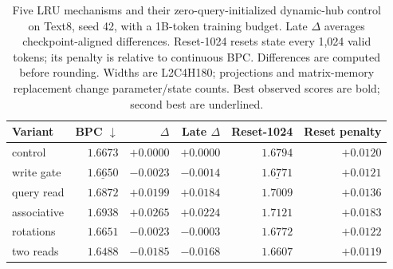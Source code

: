 \begin{table}[H]
\centering
\caption{Five LRU mechanisms and their zero-query-initialized dynamic-hub control on Text8, seed 42, with a 1B-token training budget. Late $\Delta$ averages checkpoint-aligned differences. Reset-1024 resets state every 1,024 valid tokens; its penalty is relative to continuous BPC. Differences are computed before rounding. Widths are L2C4H180; projections and matrix-memory replacement change parameter/state counts. Best observed scores are bold; second best are underlined.}
\label{tab:lruvariants}
\begin{tabular}{lrrrrr}
\toprule
Variant & BPC $\downarrow$ & $\Delta$ & Late $\Delta$ & Reset-1024 & Reset penalty \\
\midrule
control & $1.6673$ & $+0.0000$ & $+0.0000$ & $1.6794$ & $+0.0120$ \\
write gate & $\underline{1.6650}$ & $-0.0023$ & $-0.0014$ & $\underline{1.6771}$ & $+0.0121$ \\
query read & $1.6872$ & $+0.0199$ & $+0.0184$ & $1.7009$ & $+0.0136$ \\
associative & $1.6938$ & $+0.0265$ & $+0.0224$ & $1.7121$ & $+0.0183$ \\
rotations & $1.6651$ & $-0.0023$ & $-0.0003$ & $1.6772$ & $+0.0122$ \\
two reads & $\mathbf{1.6488}$ & $-0.0185$ & $-0.0168$ & $\mathbf{1.6607}$ & $+0.0119$ \\
\bottomrule
\end{tabular}
\end{table}
